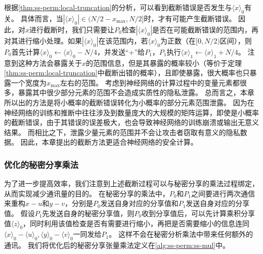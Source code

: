 根据\autoref{thm:ss-perm:local-truncation}的分析，可以看到截断错误是否发生与$\langle x \rangle_0$有关。
%
具体而言，当$|\langle x \rangle_0| \in (N/2-x_\text{max}, N/2]$时，才有可能产生截断错误。
%
因此，对$x$进行截断时，我们只需要让$P_0$检查$|\langle x \rangle_0|$是否在可能截断错误的范围内，再对其进行缩小处理。如果$|\langle x \rangle_0|$在该范围内，若$\langle x\rangle_0$为正数（在$[0, N/2)$区间），则$P_0$首先计算$\langle x \rangle_0 \gets \langle x \rangle_0 - N/4$，并发送“+”给$P_1$，$P_1$执行$\langle x \rangle_1 \gets \langle x \rangle_1 + N/4$。
%
注意到这种方法会暴露关于$x$的范围信息，但是其暴露的概率较小（等价于定理\autoref{thm:ss-perm:local-truncation}中截断出错的概率），且即使暴露，很大概率也只暴露一个宽度为$x_\text{max}$左右的范围。
%
考虑到神经网络的计算过程中的变量元素都很多，暴露其中很少部分元素的范围不会造成实质性的隐私泄露。
%
总而言之，本章所以出的方法是将小概率的截断错误转化为小概率的部分元素范围泄露。
因为在神经网络的训练和推断中往往涉及到数量庞大的大规模的矩阵运算，即使是小概率的截断错误，由于其错误的误差极大，也会导致神经网络的训练崩溃或输出无意义结果。
而相比之下，泄露少量元素的范围并不会让攻击者窃取有意义的隐私数据。
%
因此，本章提出的截断方法更适合神经网络的安全计算。

\subsubsection{优化的秘密分享乘法}
为了进一步提高效率，我们注意到上述截断过程可以与秘密分享的乘法过程绑定，从而实现减少通讯量的目的。
%
在秘密分享的乘法中，$P_0$和$P_1$之间要进行两次通信来重构$x - u$和$y - v$，分别是$P_0$发送自身对应的分享值和$P_1$发送自身对应的分享值。
%
假设$P_1$先发送自身的秘密分享值，则$P_0$收到分享值后，可以先计算乘积分享值$\langle z \rangle_0$，同时利用该值检查是否有需要进行缩小，再把是否需要缩小的信息连同$\langle x \rangle_0 - \langle u \rangle_0, \langle y \rangle_0 - \langle v \rangle_0$一同发给$P_1$。
%
这样不会在秘密分析乘法中带来任何额外的通讯。
%
我们将优化后的秘密分享张量乘法定义在\autoref{alg:ss-perm:ss-mul}中。


